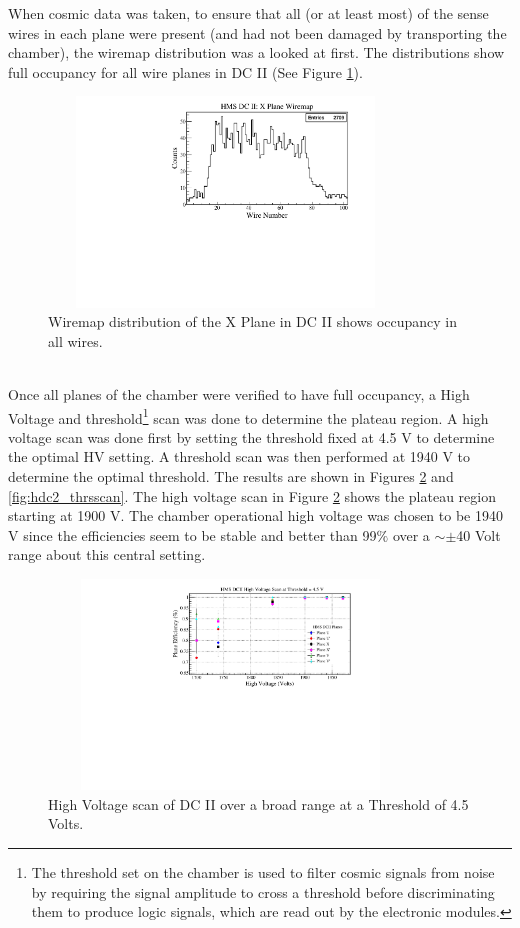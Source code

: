 \documentclass[letterpaper, 12 pt, conference]{ieeeconf}  %
\begin{document}
When cosmic data was taken, to ensure that all (or at least most) of the sense wires in each plane were present (and had not been damaged by transporting the chamber), the wiremap distribution was
a looked at first. The distributions show full occupancy for all wire planes in DC II (See Figure \ref{fig:hdc2_wiremap}).  
\begin{figure}[h!]
  \centering
  \includegraphics[width=3.7in, height=2.2in]{dc2_tests/hdc2_xmap.pdf}
  \caption{Wiremap distribution of the X Plane in DC II shows occupancy in all wires.}
  \label{fig:hdc2_wiremap}
\end{figure} \\
Once all planes of the chamber were verified to have full occupancy, a High Voltage and threshold\footnote{The threshold set on the chamber is used to filter cosmic signals from noise by requiring 
the signal amplitude to cross a threshold before discriminating them to produce logic signals, which are read out by the electronic modules.} scan was done to determine the plateau region. A high voltage scan was done first
by setting the threshold fixed at 4.5 V to determine the optimal HV setting. A threshold scan was then performed at 1940 V to determine the optimal threshold. The results are shown in Figures \ref{fig:hdc2_hvscan}
and \ref{fig:hdc2_thrsscan}. The high voltage scan in Figure \ref{fig:hdc2_hvscan} shows the plateau region starting at 1900 V. The chamber operational high voltage was chosen to be 1940 V since the efficiencies seem
to be stable and better than 99$\%$ over a $\sim\pm$40 Volt range about this central setting.
\begin{figure}[h!]
  \centering
  \includegraphics[width=3.8in, height=2.2in]{dc2_tests/dc2_hvscan_thrs45.pdf}
  \caption{High Voltage scan of DC II over a broad range at a Threshold of 4.5 Volts.}
  \label{fig:hdc2_hvscan}
\end{figure} 
\end{document}
